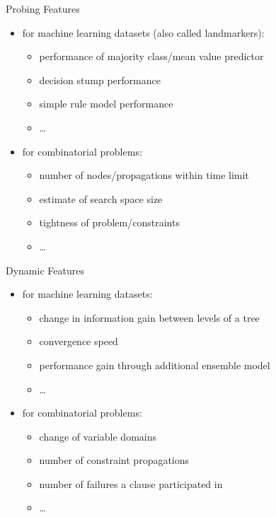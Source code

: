 \begin{frame}{Probing Features}
\begin{itemize}
    \item for machine learning datasets (also called landmarkers):
        \begin{itemize}
            \item performance of majority class/mean value predictor
            \item decision stump performance
            \item simple rule model performance
            \item \ldots
        \end{itemize}
    \item for combinatorial problems:
        \begin{itemize}
            \item number of nodes/propagations within time limit
            \item estimate of search space size
            \item tightness of problem/constraints
            \item \ldots
        \end{itemize}
\end{itemize}
\end{frame}

\begin{frame}{Dynamic Features}
\begin{itemize}
    \item for machine learning datasets:
        \begin{itemize}
            \item change in information gain between levels of a tree
            \item convergence speed
            \item performance gain through additional ensemble model
            \item \ldots
        \end{itemize}
    \item for combinatorial problems:
        \begin{itemize}
            \item change of variable domains
            \item number of constraint propagations
            \item number of failures a clause participated in
            \item \ldots
        \end{itemize}
\end{itemize}
\end{frame}

